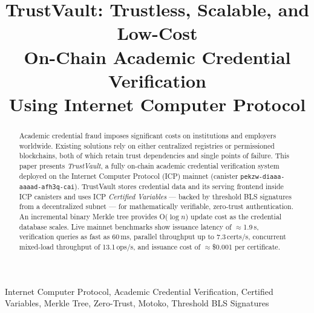 \documentclass[conference]{IEEEtran}
\begin{document}
\title{TrustVault: Trustless, Scalable, and Low-Cost\\On-Chain Academic Credential Verification\\Using Internet Computer Protocol}

\author{
  \and
  
}

\maketitle

\begin{abstract}
Academic credential fraud imposes significant costs on institutions and employers worldwide. Existing solutions rely on either centralized registries or permissioned blockchains, both of which retain trust dependencies and single points of failure. This paper presents \textit{TrustVault}, a fully on-chain academic credential verification system deployed on the Internet Computer Protocol (ICP) mainnet (canister \texttt{pekzw-diaaa-aaaad-afh3q-cai}). TrustVault stores credential data and its serving frontend inside ICP canisters and uses ICP \textit{Certified Variables} — backed by threshold BLS signatures from a decentralized subnet — for mathematically verifiable, zero-trust authentication. An incremental binary Merkle tree provides O($\log n$) update cost as the credential database scales. Live mainnet benchmarks show issuance latency of $\approx$1.9\,s, verification queries as fast as 60\,ms, parallel throughput up to 7.3\,certs/s, concurrent mixed-load throughput of 13.1\,ops/s, and issuance cost of $\approx$\$0.001 per certificate.
\end{abstract}

\begin{IEEEkeywords}
Internet Computer Protocol, Academic Credential Verification, Certified Variables, Merkle Tree, Zero-Trust, Motoko, Threshold BLS Signatures
\end{IEEEkeywords}
\end{document}
